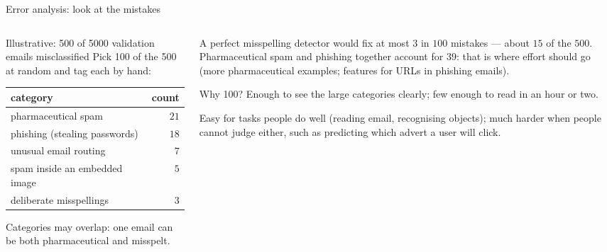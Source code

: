 \documentclass[aspectratio=169,10pt]{beamer}
\begin{document}
\begin{frame}{Error analysis: look at the mistakes}
  \begin{columns}[T,onlytextwidth]
    \begin{column}{0.52\textwidth}
      \footnotesize
      \begin{block}{Illustrative: 500 of 5000 validation emails misclassified}
        Pick 100 of the 500 at random and tag each by hand:\par
        \vspace{1mm}
        \renewcommand{\arraystretch}{1.15}
        \begin{tabular}{@{}lr@{}}
          \toprule
          category & count\\
          \midrule
          pharmaceutical spam & $21$\\
          phishing (stealing passwords) & $18$\\
          unusual email routing & $7$\\
          spam inside an embedded image & $5$\\
          deliberate misspellings & $3$\\
          \bottomrule
        \end{tabular}\par
        \vspace{1mm}
        Categories may overlap: one email can be both pharmaceutical and misspelt.
      \end{block}
    \end{column}
    \begin{column}{0.44\textwidth}
      \footnotesize
      \begin{keyidea}
        A perfect misspelling detector would fix at most $3$ in $100$ mistakes --- about
        $15$ of the $500$. Pharmaceutical spam and phishing together account for $39$:
        that is where effort should go (more pharmaceutical examples; features for URLs in
        phishing emails).
      \end{keyidea}
      Why 100? Enough to see the large categories clearly; few enough to read in an hour or
      two.
      \begin{pitfall}[Limits]
        \footnotesize Easy for tasks people do well (reading email, recognising objects);
        much harder when people cannot judge either, such as predicting which advert a
        user will click.
      \end{pitfall}
    \end{column}
  \end{columns}
\end{frame}
\end{document}
